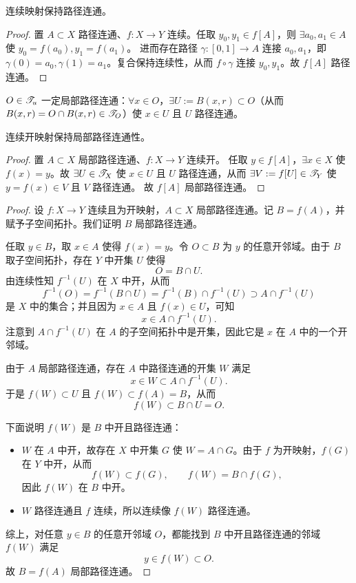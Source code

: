 \begin{theorem}
    连续映射保持路径连通。
\end{theorem}

\begin{proof}
    置 $A\subset X$ 路径连通、$f:X\to Y$ 连续。任取 $y_0,y_1\in f[A]$，则 $\exists a_0,a_1\in A$ 使 $y_0=f(a_0),y_1=f(a_1)$。
    进而存在路径 $\gamma:[0,1]\to A$ 连接 $a_0,a_1$，即 $\gamma(0)=a_0,\gamma(1)=a_1$。复合保持连续性，从而 $f\circ\gamma$ 连接 $y_0,y_1$。故 $f[A]$ 路径连通。
\end{proof}

\begin{example}
    $O\in\mathscr T_u$ 一定局部路径连通：$\forall x\in O$，$\exists U:= B(x,r)\subset O$（从而 $B(x,r)=O\cap B(x,r)\in\mathscr T_O$）使 $x\in U$ 且 $U$ 路径连通。
\end{example}

\begin{theorem}
    连续开映射保持局部路径连通性。
\end{theorem}
\begin{proof}
置 $A\subset X$ 局部路径连通、$f:X\to Y$ 连续开。 
任取 $y\in f[A]$，$\exists x\in X$ 使 $f(x)=y$。故 $\exists U\in\mathscr T_X$ 使 $x\in U$ 且 $U$ 路径连通，从而 $\exists V:=f[U]\in\mathscr T_Y$ 使 $y=f(x)\in V$ 且 $V$ 路径连通。
故 $f[A]$ 局部路径连通。
\end{proof}

\begin{proof}
设 $f:X\to Y$ 连续且为开映射，$A\subset X$ 局部路径连通。记 $B=f(A)$，并赋予子空间拓扑。我们证明 $B$ 局部路径连通。

任取 $y\in B$，取 $x\in A$ 使得 $f(x)=y$。令 $O\subset B$ 为 $y$ 的任意开邻域。由于 $B$ 取子空间拓扑，存在 $Y$ 中开集 $U$ 使得
\[
O=B\cap U.
\]
由连续性知 $f^{-1}(U)$ 在 $X$ 中开，从而
\[
f^{-1}(O)=f^{-1}(B\cap U)=f^{-1}(B)\cap f^{-1}(U)\supset A\cap f^{-1}(U)
\]
是 $X$ 中的集合；并且因为 $x\in A$ 且 $f(x)\in U$，可知
\[
x\in A\cap f^{-1}(U).
\]
注意到 $A\cap f^{-1}(U)$ 在 $A$ 的子空间拓扑中是开集，因此它是 $x$ 在 $A$ 中的一个开邻域。

由于 $A$ 局部路径连通，存在 $A$ 中路径连通的开集 $W$ 满足
\[
x\in W\subset A\cap f^{-1}(U).
\]
于是 $f(W)\subset U$ 且 $f(W)\subset f(A)=B$，从而
\[
f(W)\subset B\cap U=O.
\]

下面说明 $f(W)$ 是 $B$ 中开且路径连通：
\begin{itemize}
\item $W$ 在 $A$ 中开，故存在 $X$ 中开集 $G$ 使 $W=A\cap G$。由于 $f$ 为开映射，$f(G)$ 在 $Y$ 中开，从而
\[
f(W)\subset f(G),\qquad f(W)=B\cap f(G),
\]
因此 $f(W)$ 在 $B$ 中开。
\item $W$ 路径连通且 $f$ 连续，所以连续像 $f(W)$ 路径连通。
\end{itemize}

综上，对任意 $y\in B$ 的任意开邻域 $O$，都能找到 $B$ 中开且路径连通的邻域 $f(W)$ 满足
\[
y\in f(W)\subset O.
\]
故 $B=f(A)$ 局部路径连通。
\end{proof}


